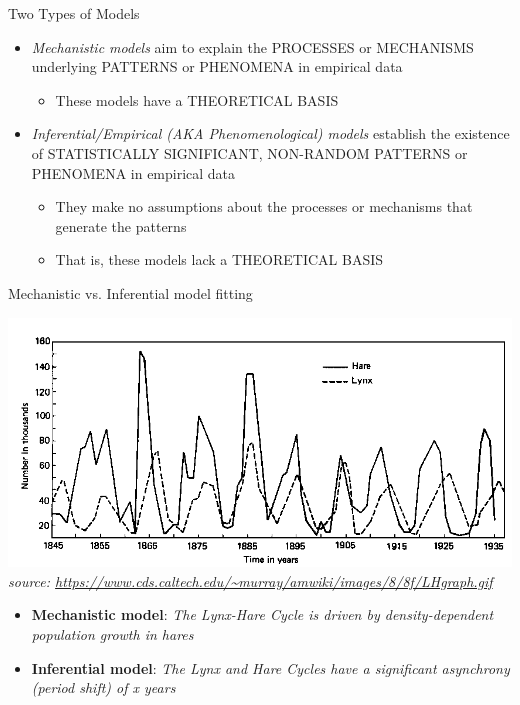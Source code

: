\documentclass[xcolor=x11names,compress]{beamer}
\renewcommand{\(}{\begin{columns}}
\renewcommand{\)}{\end{columns}}
\newcommand{\<}[1]{\begin{column}{#1}}
\renewcommand{\>}{\end{column}}
\begin{document}
\begin{frame}{Two Types of Models}

	\begin{itemize}[<+->]\itemsep20pt

		\item {\it Mechanistic models} aim to explain the PROCESSES or MECHANISMS underlying PATTERNS or PHENOMENA in empirical data 
		\begin{itemize}
			\item These models have a THEORETICAL BASIS
		\end{itemize}
 
		\item {\it Inferential/Empirical (AKA Phenomenological) models} establish the existence of
		STATISTICALLY SIGNIFICANT, NON-RANDOM PATTERNS or PHENOMENA in empirical
		data
		\begin{itemize}
			\item They make no assumptions about the processes or mechanisms that generate the patterns
			\item That is, these models lack a THEORETICAL BASIS
		\end{itemize}
			
	  \end{itemize}
 
 \end{frame}
 
\begin{frame}{Mechanistic vs. Inferential model fitting}

\begin{center}
		\includegraphics[width=.7\textwidth]{graphics/L-H_cycle.png}\\
		{\it \tiny source: \url{https://www.cds.caltech.edu/~murray/amwiki/images/8/8f/LHgraph.gif}}
\end{center}
\pause
\begin{itemize}[<+->] \itemsep6pt

	\item {\bf Mechanistic model}: \it The Lynx-Hare Cycle is driven by density-dependent population growth in hares

	\item {\bf Inferential model}: \it The Lynx and Hare Cycles have a significant asynchrony (period shift) of x years

\end{itemize}

 \end{frame}
 
\end{document}
